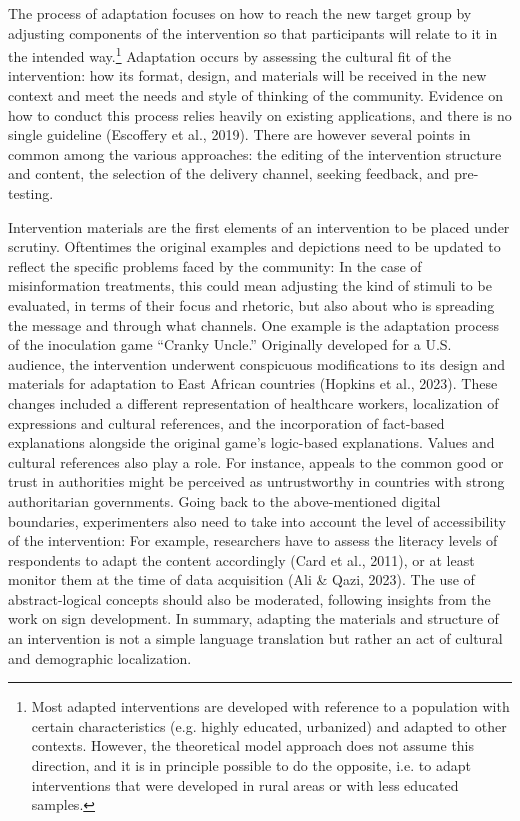 \documentclass[authordate, reflection]{jote-new-article}
\begin{document}
\newpage


	The process of adaptation focuses on how to reach the new target group by adjusting components of the intervention so that participants will relate to it in the intended way.\footnote{Most adapted interventions are developed with reference to a population with certain characteristics (e.g. highly educated, urbanized) and adapted to other contexts. However, the theoretical model approach does not assume this direction, and it is in principle possible to do the opposite, i.e. to adapt interventions that were developed in rural areas or with less educated samples.} Adaptation occurs by assessing the cultural fit of the intervention: how its format, design, and materials will be received in the new context and meet the needs and style of thinking of the community. Evidence on how to conduct this process relies heavily on existing applications, and there is no single guideline (Escoffery et al., 2019). There are however several points in common among the various approaches: the editing of the intervention structure and content, the selection of the delivery channel, seeking feedback, and pre-testing.



	Intervention materials are the first elements of an intervention to be placed under scrutiny. Oftentimes the original examples and depictions need to be updated to reflect the specific problems faced by the community: In the case of misinformation treatments, this could mean adjusting the kind of stimuli to be evaluated, in terms of their focus and rhetoric, but also about who is spreading the message and through what channels. One example is the adaptation process of the inoculation game “Cranky Uncle.” Originally developed for a U.S. audience, the intervention underwent conspicuous modifications to its design and materials for adaptation to East African countries (Hopkins et al., 2023). These changes included a different representation of healthcare workers, localization of expressions and cultural references, and the incorporation of fact-based explanations alongside the original game's logic-based explanations. Values and cultural references also play a role. For instance, appeals to the common good or trust in authorities might be perceived as untrustworthy in countries with strong authoritarian governments. Going back to the above-mentioned digital boundaries, experimenters also need to take into account the level of accessibility of the intervention: For example, researchers have to assess the literacy levels of respondents to adapt the content accordingly (Card et al., 2011), or at least monitor them at the time of data acquisition (Ali \& Qazi, 2023). The use of abstract-logical concepts should also be moderated, following insights from the work on sign development. In summary, adapting the materials and structure of an intervention is not a simple language translation but rather an act of cultural and demographic localization.
\end{document}
